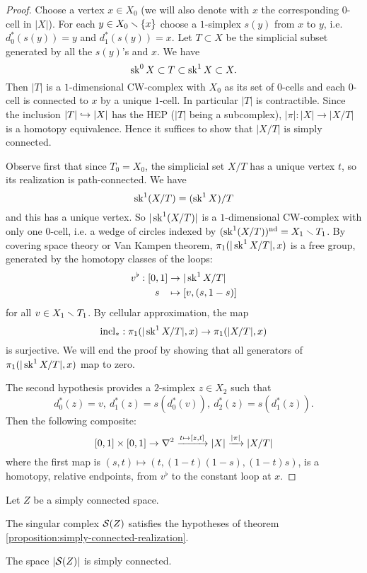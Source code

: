 \begin{proof}
Choose a vertex $x\in X_0$ (we will also denote with $x$ the corresponding $0$-cell in $|X|$). For each $y\in X_0\sm\cb{x}$ choose a $1$-simplex $s(y)$ from $x$ to $y$, i.e. $d_0^*(s(y))=y$ and $d_1^*(s(y))=x$. Let $T\subset X$ be the simplicial subset generated by all the $s(y)$'s and $x$. We have
\[\sk^0 X\subset T\subset\sk^{1} X\subset X.\]
Then $|T|$ is a $1$-dimensional CW-complex with $X_0$ as its set of $0$-cells and each $0$-cell is connected to $x$ by a unique $1$-cell. In particular $|T|$ is contractible. Since the inclusion $|T|\into|X|$ has the HEP ($|T|$ being a subcomplex), $|\pi|:|X|\to|X/T|$ is a homotopy equivalence. Hence it suffices to show that $|X/T|$ is simply connected.

Observe first that since $T_0=X_0$, the simplicial set $X/T$ has a unique vertex $t$, so its realization is path-connected. We have
\[\sk^1(X/T)=(\sk^1 X)/T\]
and this has a unique vertex. So $|\sk^1(X/T)|$ is a $1$-dimensional CW-complex with only one $0$-cell, i.e. a wedge of circles indexed by $(\sk^1(X/T))^\text{nd}=X_1\sm T_1$. By covering space theory or Van Kampen theorem, $\pi_1(|\sk^1 X/T|,x)$ is a free group, generated by the homotopy classes of the loops:
\begin{align*}
v^\flat:[0,1]&\to|\sk^1 X/T|\\
s\ \ \,&\mapsto[v,(s,1-s)]
\end{align*}
for all $v\in X_1\sm T_1$. By cellular approximation, the map
\[\incl_*:\pi_1(|\sk^1 X/T|,x)\to\pi_1(|X/T|,x)\]
is surjective. We will end the proof by showing that all generators of $\pi_1(|\sk^1 X/T|,x)$ map to zero.

The second hypothesis provides a $2$-simplex $z\in X_2$ such that
\[d_0^*(z)=v,\ d_1^*(z)=s(d_0^*(v)),\ d_2^*(z)=s(d_1^*(z)).\]
Then the following composite:
\[
[0,1]\times[0,1]\to\sx{2}\xto{t\mapsto[z,t]}|X|\xto{|\pi|}|X/T|
\]
where the first map is $(s,t)\mapsto(t,(1-t)(1-s),(1-t)s)$, is a homotopy, relative endpoints, from $v^\flat$ to the constant loop at $x$.\alvaropls
\end{proof}

\begin{corollary}\label{corollary:simply-connected-realization-of-singular-complex}
Let $Z$ be a simply connected space.
\begin{numerate}
\item The singular complex $\S(Z)$ satisfies the hypotheses of theorem \ref{proposition:simply-connected-realization}.
\item The space $|\S(Z)|$ is simply connected.
\end{numerate}
\end{corollary}

